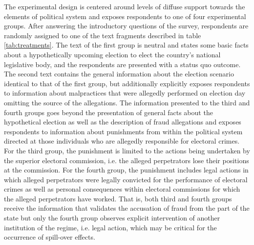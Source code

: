 \documentclass[11pt, ngerman,english,a4]{article}
\begin{document}
The experimental design is centered around levels of diffuse support towards the elements of political system and exposes respondents to one of four experimental groups. 
After answering the introductory questions of the survey, respondents are randomly assigned to one of the text fragments described in table \ref{tab:treatments}. 
The text of the first group is neutral and states some basic facts about a hypothetically upcoming election to elect the country's national legislative body, and the respondents are presented with a status quo outcome. 
The second text contains the general information about the election scenario identical to that of the first group, but additionally explicitly exposes respondents to information about malpractices that were allegedly performed on election day omitting the source of the allegations.
The information presented to the third and fourth groups goes beyond the presentation of general facts about the hypothetical election as well as the description of fraud allegations and exposes respondents to information about punishments from within the political system directed at those individuals who are allegedly responsible for electoral crimes. 
For the third group, the punishment is limited to the actions being undertaken by the superior electoral commission, i.e. the alleged perpetrators lose their positions at the commission. 
For the fourth group, the punishment includes legal actions in which alleged perpetrators were legally convicted for the performance of electoral crimes as well as personal consequences within electoral commissions for which the alleged perpetrators have worked. 
That is, both third and fourth groups receive the information that validates the accusation of fraud from the part of the state but only the fourth group observes explicit intervention of another institution of the regime, i.e. legal action, which may be critical for the occurrence of spill-over effects.  
\end{document}

